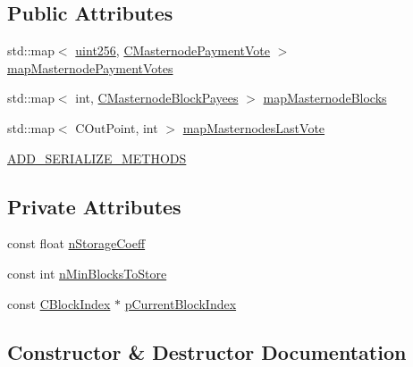 \subsection*{Public Attributes}
\begin{DoxyCompactItemize}
\item 
std\+::map$<$ \mbox{\hyperlink{classuint256}{uint256}}, \mbox{\hyperlink{class_c_masternode_payment_vote}{C\+Masternode\+Payment\+Vote}} $>$ \mbox{\hyperlink{class_c_masternode_payments_a830408cb2635a3e3b4a1c48d1deefb85}{map\+Masternode\+Payment\+Votes}}
\item 
std\+::map$<$ int, \mbox{\hyperlink{class_c_masternode_block_payees}{C\+Masternode\+Block\+Payees}} $>$ \mbox{\hyperlink{class_c_masternode_payments_a6feb2c94183cd649ede84dc38d3ae442}{map\+Masternode\+Blocks}}
\item 
std\+::map$<$ C\+Out\+Point, int $>$ \mbox{\hyperlink{class_c_masternode_payments_a8922cb51ac6a8aeb4e590d5e18b5bd1a}{map\+Masternodes\+Last\+Vote}}
\item 
\mbox{\hyperlink{class_c_masternode_payments_a0f90877d276308aa16314dcaa84f332c}{A\+D\+D\+\_\+\+S\+E\+R\+I\+A\+L\+I\+Z\+E\+\_\+\+M\+E\+T\+H\+O\+DS}}
\end{DoxyCompactItemize}
\subsection*{Private Attributes}
\begin{DoxyCompactItemize}
\item 
const float \mbox{\hyperlink{class_c_masternode_payments_a849874b6a32a2efafb4b19f53551cefc}{n\+Storage\+Coeff}}
\item 
const int \mbox{\hyperlink{class_c_masternode_payments_aab34cb80ed48506ef3bdc231f41425b4}{n\+Min\+Blocks\+To\+Store}}
\item 
const \mbox{\hyperlink{class_c_block_index}{C\+Block\+Index}} $\ast$ \mbox{\hyperlink{class_c_masternode_payments_ac0198d421f1ce64bc8da825f08b60b30}{p\+Current\+Block\+Index}}
\end{DoxyCompactItemize}


\subsection{Constructor \& Destructor Documentation}
\mbox{\label{class_c_masternode_payments_a4b9454f265a927528c881716e7649973}} 
